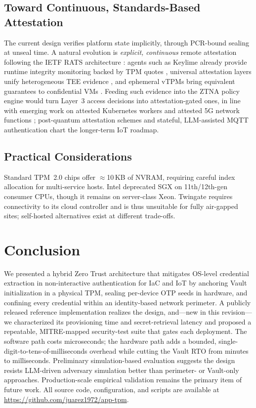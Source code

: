 \documentclass[journal]{IEEEtran}
\begin{document}
\subsection{Toward Continuous, Standards-Based Attestation}
The current design verifies platform state implicitly, through PCR-bound
sealing at unseal time. A natural evolution is \emph{explicit, continuous}
remote attestation following the IETF RATS architecture \cite{rfc9334}:
agents such as Keylime already provide runtime integrity monitoring backed by
TPM quotes \cite{ruffin2025keylime}, universal attestation layers unify
heterogeneous TEE evidence \cite{ott2023universal,menetrey2022attestation},
and ephemeral vTPMs bring equivalent guarantees to confidential VMs
\cite{narayanan2023vtpm}. Feeding such evidence into the ZTNA policy engine
would turn Layer~3 access decisions into attestation-gated ones, in line with
emerging work on attested Kubernetes workers \cite{thijsman2024attestedk8s}
and attested 5G network functions \cite{emran2025vnf}; post-quantum
attestation schemes \cite{eckel2025pqattest} and stateful, LLM-assisted MQTT
authentication \cite{jamil2026mqtt} chart the longer-term IoT roadmap.

\subsection{Practical Considerations}
Standard TPM~2.0 chips offer $\approx$10\,KB of NVRAM, requiring careful index
allocation for multi-service hosts. Intel deprecated SGX on 11th/12th-gen
consumer CPUs, though it remains on server-class Xeon. Twingate requires
connectivity to its cloud controller and is thus unsuitable for fully
air-gapped sites; self-hosted alternatives exist at different trade-offs.

\section{Conclusion}\label{sec:concl}
We presented a hybrid Zero Trust architecture that mitigates OS-level
credential extraction in non-interactive authentication for IaC and IoT by
anchoring Vault initialization in a physical TPM, sealing per-device OTP seeds
in hardware, and confining every credential within an identity-based network
perimeter. A publicly released reference implementation realizes the design,
and---new in this revision---we characterized its provisioning time and
secret-retrieval latency and proposed a repeatable, MITRE-mapped security-test
suite that gates each deployment. The software path costs microseconds; the
hardware path adds a bounded, single-digit-to-tens-of-milliseconds overhead
while cutting the Vault RTO from minutes to milliseconds. Preliminary
simulation-based evaluation suggests the design resists LLM-driven adversary
simulation better than perimeter- or Vault-only approaches. Production-scale
empirical validation remains the primary item of future work. All source code,
configuration, and scripts are available at
\url{https://github.com/juarez1972/app-tpm}.
\end{document}
